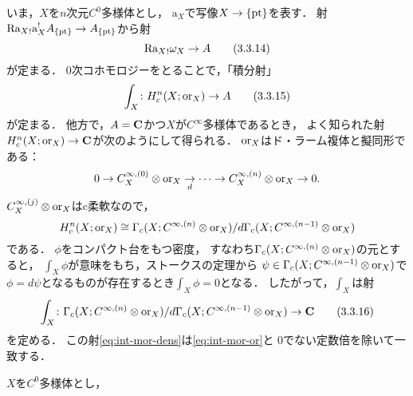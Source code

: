 \bigskip

いま，\(X\)を\(n\)次元\(C^0\)多様体とし，
\(\mathrm{a}_X\)で写像\(X\to\{\mathop{\mathrm{pt}}\nolimits\}\)を表す．
射\(
    {\mathrm{R}\mathrm{a}_X}_!\mathrm{a}_X^!A_{\{\mathop{\mathrm{pt}}\nolimits\}}
    \to A_{\{\mathop{\mathrm{pt}}\nolimits\}}
\)から射
\begin{equation}
    {\mathrm{R}\mathrm{a}_X}_!\omega_X\to A\tag{3.3.14}
\end{equation}
が定まる．
\(0\)次コホモロジーをとることで，「積分射」
\begin{equation}\label{eq:int-mor-or}
    \int_X\colon H^n_c(X;\mathord{\mathrm{or}}_X)\to A\tag{3.3.15}
\end{equation}
が定まる．
他方で，\(A=\mathbf{C}\)かつ\(X\)が\(C^\infty\)多様体であるとき，
よく知られた射\(H^n_c(X;\mathord{\mathrm{or}}_X)\to \mathbf{C}\)が次のようにして得られる．
\(\mathord{\mathrm{or}}_X\)はド・ラーム複体と擬同形である：
\[
    0\to C_X^{\infty,(0)}\otimes\mathord{\mathrm{or}}_X\underset{d}{\to}
    \cdots
    \to
    C_X^{\infty,(n)}\otimes\mathord{\mathrm{or}}_X
    \to0.
\]
\(
    C_X^{\infty,(j)}\otimes\mathord{\mathrm{or}}_X
\)はc柔軟なので，
\[
    H^n_c(X;\mathord{\mathrm{or}}_X)
    \cong
    \Gamma_c(X;C^{\infty,(n)}\otimes\mathord{\mathrm{or}}_X)/d\Gamma_c(X;C^{\infty,(n-1)}\otimes\mathord{\mathrm{or}}_X)
\]である．
\(\phi\)をコンパクト台をもつ密度，
すなわち\(\Gamma_c(X;C^{\infty,(n)}\otimes\mathord{\mathrm{or}}_X)\)の元とすると，
\(\int_X\phi\)が意味をもち，ストークスの定理から
\(\psi\in\Gamma_c(X;C^{\infty,(n-1)}\otimes\mathord{\mathrm{or}}_X)\)で
\(\phi=d\psi\)となるものが存在するとき\(\int_X\phi=0\)となる．
したがって，\(\int_X\)は射
\begin{equation}\label{eq:int-mor-dens}
    \int_X\colon
    \Gamma_c(X;C^{\infty,(n)}\otimes\mathord{\mathrm{or}}_X)/d\Gamma_c(X;C^{\infty,(n-1)}\otimes\mathord{\mathrm{or}}_X)
    \to\mathbf{C}\tag{3.3.16}
\end{equation}
を定める．
この射\eqref{eq:int-mor-dens}は\eqref{eq:int-mor-or}と
0でない定数倍を除いて一致する．

\begin{PRP}
    \(X\)を\(C^0\)多様体とし，
\end{PRP}










